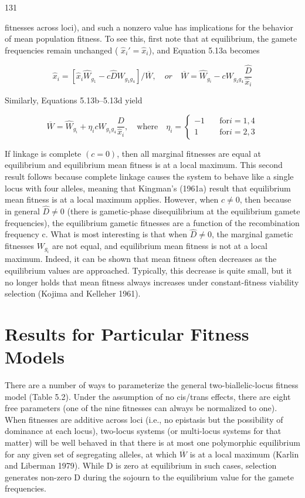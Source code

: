 \documentclass{article}
\begin{document}
131

fitnesses across loci), and such a nonzero value has implications for the behavior of mean population fitness. To see this, first note that at equilibrium, the gamete frequencies remain unchanged ( $ \widehat{x}_i' = \widehat{x}_i $), and Equation 5.13a becomes

\begin{equation}
\widehat{x}_{i}=[\widehat{x}_{i}\widehat{W}_{g_{1}}-c\widehat{D}W_{g_{1}g_{4}}]/\overline{W},\quad or\quad\overline{W}=\widehat{W}_{g_{i}}-c W_{g_{1}g_{4}}\frac{\widehat{D}}{\widehat{x}_{i}}
\end{equation}

Similarly, Equations 5.13b–5.13d yield

\begin{equation}
\overline{W}=\widehat{W}_{g_{i}}+\eta_{i}c W_{g_{1}g_{4}}\frac{\widehat{D}}{\widehat{x}_{i}},\quad\mathrm{w h e r e}\quad\eta_{i}=\left\{\begin{aligned}-1&\quad\mathrm{f o r}i=1,4\\ 1&\quad\mathrm{f o r}i=2,3\end{aligned}\right.
\tag{5.14}
\label{eq:5_14}
\end{equation}

If linkage is complete  $ (c = 0) $, then all marginal fitnesses are equal at equilibrium and equilibrium mean fitness is at a local maximum. This second result follows because complete linkage causes the system to behave like a single locus with four alleles, meaning that Kingman's (1961a) result that equilibrium mean fitness is at a local maximum applies. However, when  $ c \neq 0 $, then because in general  $ \widehat{D} \neq 0 $ (there is gametic-phase disequilibrium at the equilibrium gamete frequencies), the equilibrium gametic fitnesses are a function of the recombination frequency c. What is most interesting is that when  $ \widehat{D} \neq 0 $, the marginal gametic fitnesses  $ W_{g_i} $ are not equal, and equilibrium mean fitness is not at a local maximum. Indeed, it can be shown that mean fitness often decreases as the equilibrium values are approached. Typically, this decrease is quite small, but it no longer holds that mean fitness always increases under constant-fitness viability selection (Kojima and Kelleher 1961).

\section{Results for Particular Fitness Models}
There are a number of ways to parameterize the general two-biallelic-locus fitness model (Table 5.2). Under the assumption of no cis/trans effects, there are eight free parameters (one of the nine fitnesses can always be normalized to one). When fitnesses are additive across loci (i.e., no epistasis but the possibility of dominance at each locus), two-locus systems (or multi-locus systems for that matter) will be well behaved in that there is at most one polymorphic equilibrium for any given set of segregating alleles, at which  $ \overline{W} $ is at a local maximum (Karlin and Liberman 1979). While D is zero at equilibrium in such cases, selection generates non-zero D during the sojourn to the equilibrium value for the gamete frequencies.
\end{document}
